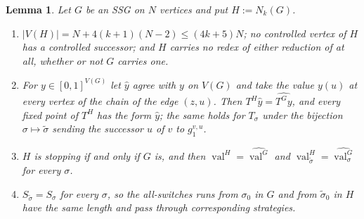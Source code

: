 \documentclass[11pt]{article}
\theoremstyle{plain}
\newtheorem{lemma}[theorem]{Lemma}
\theoremstyle{definition}
\DeclareMathOperator{\val}{val}
\begin{document}
\begin{lemma}\label{lem:kblind}
Let $G$ be an SSG on $N$ vertices and put $H:=N_k(G)$.
\begin{enumerate}[label=(\roman*),leftmargin=2.2em]
\item $|V(H)|=N+4(k+1)(N-2)\le(4k+5)N$; no controlled vertex of $H$ has
      a controlled successor; and $H$ carries no redex of either
      reduction of  at all, whether or not $G$ carries
      one.
\item For $y\in[0,1]^{V(G)}$ let $\hat y$ agree with $y$ on $V(G)$ and
      take the value $y(u)$ at every vertex of the chain of the edge
      $(z,u)$. Then $T^{H}\hat y=\widehat{T^{G}y}$, and every fixed point
      of $T^{H}$ has the form $\hat y$; the same holds for $T_\sigma$
      under the bijection $\sigma\mapsto\tilde\sigma$ sending the
      successor $u$ of $v$ to $g^{v,u}_1$.
\item $H$ is stopping if and only if $G$ is, and then
      $\val^{H}=\widehat{\val^{G}}$ and
      $\val^{H}_{\tilde\sigma}=\widehat{\val^{G}_{\sigma}}$ for every
      $\sigma$.
\item $S_{\tilde\sigma}=S_\sigma$ for every $\sigma$, so the all-switches
      runs from $\sigma_0$ in $G$ and from $\tilde\sigma_0$ in $H$ have
      the same length and pass through corresponding strategies.
\end{enumerate}
\end{lemma}
\end{document}
